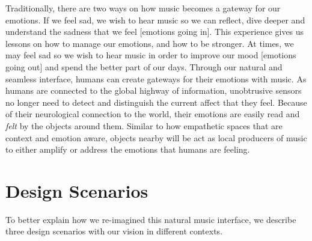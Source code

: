 \documentclass[sigchi]{acmart}
\begin{document}
Traditionally, there are two ways on how music becomes a gateway for our emotions. If we feel sad, we wish to hear music so we can reflect, dive deeper and understand the sadness that we feel [emotions going in]. This experience gives us lessons on how to manage our emotions, and how to be stronger. At times, we may feel sad so we wish to hear music in order to improve our mood [emotions going out] and spend the better part of our days. Through our natural and seamless interface, humans can create gateways for their emotions with music. As humans are connected to the global highway of information, unobtrusive sensors no longer need to detect and distinguish the current affect that they feel. Because of their neurological connection to the world, their emotions are easily read and \textit{felt} by the objects around them. Similar to how empathetic spaces that are context and emotion aware, objects nearby will be act as local producers of music to either amplify or address the emotions that humans are feeling. 
% 
\section{Design Scenarios}
To better explain how we re-imagined this natural music interface, we describe three design scenarios with our vision in different contexts. %
\end{document}
